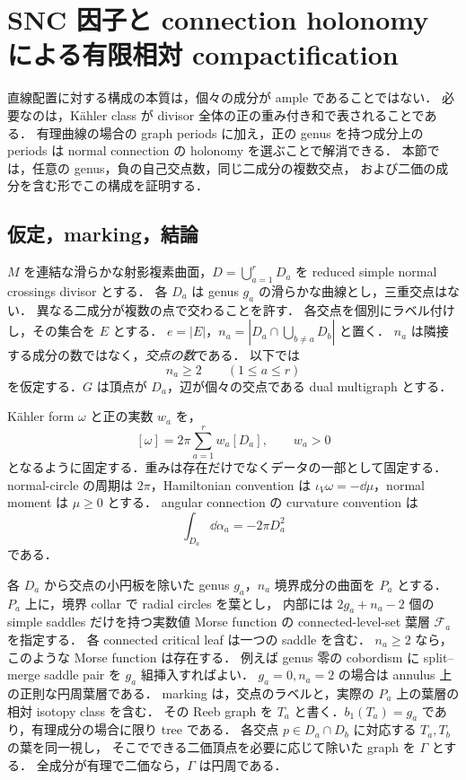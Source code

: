 \section{SNC 因子と connection holonomy による有限相対 compactification}
\label{snc:section}

直線配置に対する構成の本質は，個々の成分が ample であることではない．
必要なのは，Kähler class が divisor 全体の正の重み付き和で表されることである．
有理曲線の場合の graph periods に加え，正の genus を持つ成分上の periods は
normal connection の holonomy を選ぶことで解消できる．
本節では，任意の genus，負の自己交点数，同じ二成分の複数交点，
および二価の成分を含む形でこの構成を証明する．

\subsection{仮定，marking，結論}

$M$ を連結な滑らかな射影複素曲面，$D=\bigcup_{a=1}^{r}D_a$ を
reduced simple normal crossings divisor とする．
各 $D_a$ は genus $g_a$ の滑らかな曲線とし，三重交点はない．
異なる二成分が複数の点で交わることを許す．
各交点を個別にラベル付けし，その集合を $E$ とする．
$e=|E|$，$n_a=|D_a\cap\bigcup_{b\ne a}D_b|$ と置く．
$n_a$ は隣接する成分の数ではなく，\emph{交点の数}である．
以下では
\begin{equation}\label{snc:valence}
 n_a\geq2\qquad(1\leq a\leq r)
\end{equation}
を仮定する．$G$ は頂点が $D_a$，辺が個々の交点である dual multigraph とする．

Kähler form $\omega$ と正の実数 $w_a$ を，
\begin{equation}\label{snc:positive-class}
 [\omega]=2\pi\sum_{a=1}^{r}w_a[D_a],\qquad w_a>0
\end{equation}
となるように固定する．重みは存在だけでなくデータの一部として固定する．
normal-circle の周期は $2\pi$，Hamiltonian convention は
$\iota_V\omega=-\dd\mu$，normal moment は $\mu\geq0$ とする．
angular connection の curvature convention は
\begin{equation}\label{snc:curvature-convention}
 \int_{D_a}\dd\alpha_a=-2\pi D_a^2
\end{equation}
である．

各 $D_a$ から交点の小円板を除いた genus $g_a$，$n_a$ 境界成分の曲面を $P_a$ とする．
$P_a$ 上に，境界 collar で radial circles を葉とし，
内部には $2g_a+n_a-2$ 個の simple saddles だけを持つ実数値 Morse function の
connected-level-set 葉層 $\mathcal F_a$ を指定する．
各 connected critical leaf は一つの saddle を含む．
$n_a\geq2$ なら，このような Morse function は存在する．
例えば genus 零の cobordism に split--merge saddle pair を $g_a$ 組挿入すればよい．
$g_a=0,n_a=2$ の場合は annulus 上の正則な円周葉層である．
marking は，交点のラベルと，実際の $P_a$ 上の葉層の相対 isotopy class を含む．
その Reeb graph を $T_a$ と書く．$b_1(T_a)=g_a$ であり，有理成分の場合に限り tree である．
各交点 $p\in D_a\cap D_b$ に対応する $T_a,T_b$ の葉を同一視し，
そこでできる二価頂点を必要に応じて除いた graph を $\Gamma$ とする．
全成分が有理で二価なら，$\Gamma$ は円周である．

